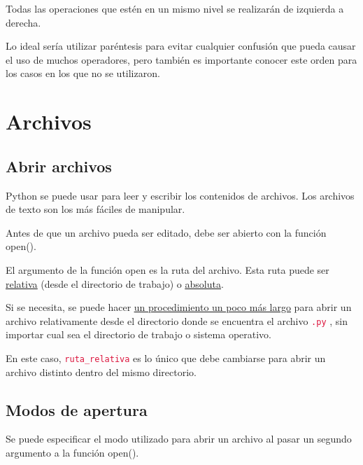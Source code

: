 \documentclass{report}
\newcommand{\link}[2]{\href{#1}{\underline{#2}}}
\newcommand{\ttt}[1]{
  \textcolor{Crimson}{\texttt{#1}}
}
\begin{document}
Todas las operaciones que estén en un mismo nivel se realizarán de izquierda a derecha.\smallskip

Lo ideal sería utilizar paréntesis para evitar cualquier confusión que pueda causar el uso de muchos operadores, pero también es importante conocer este orden para los casos en los que no se utilizaron.

\clearpage\chapter{Archivos}


\section{Abrir archivos}

Python se puede usar para leer y escribir los contenidos de archivos. Los archivos de texto son los más fáciles de manipular.\smallskip

Antes de que un archivo pueda ser editado, debe ser abierto con la función open().


El argumento de la función open es la ruta del archivo. Esta ruta puede ser \link{https://www.discoduroderoer.es/rutas-relativas-y-absolutas/}{relativa} (desde el directorio de trabajo) o \link{https://www.discoduroderoer.es/rutas-relativas-y-absolutas/}{absoluta}.\smallskip

Si se necesita, se puede hacer \link{https://stackoverflow.com/questions/7165749/open-file-in-a-relative-location-in-python}{un procedimiento un poco más largo} para abrir un archivo relativamente desde el directorio donde se encuentra el archivo \ttt{.py}, sin importar cual sea el directorio de trabajo o sistema operativo.


En este caso, \ttt{ruta\_relativa} es lo único que debe cambiarse para abrir un archivo distinto dentro del mismo directorio.

\section{Modos de apertura}

Se puede especificar el modo utilizado para abrir un archivo al pasar un segundo argumento a la función open().
\end{document}
